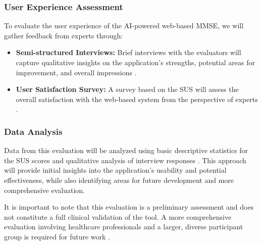\subsubsection{User Experience Assessment}
To evaluate the user experience of the AI-powered web-based MMSE, we will gather feedback from experts through:
\begin{itemize}
\item \textbf{Semi-structured Interviews:} Brief interviews with the evaluators will capture qualitative insights on the application's strengths, potential areas for improvement, and overall impressions \cite{Wild2021}.
\item \textbf{User Satisfaction Survey:} A survey based on the SUS will assess the overall satisfaction with the web-based system from the perspective of experts \cite{Brooke1996}.
\end{itemize}

\subsubsection{Data Analysis}
Data from this evaluation will be analyzed using basic descriptive statistics for the SUS scores and qualitative analysis of interview responses \cite{Braun2006}. This approach will provide initial insights into the application's usability and potential effectiveness, while also identifying areas for future development and more comprehensive evaluation.

It is important to note that this evaluation is a preliminary assessment and does not constitute a full clinical validation of the tool. A more comprehensive evaluation involving healthcare professionals and a larger, diverse participant group is required for future work \cite{Geddes2020}.